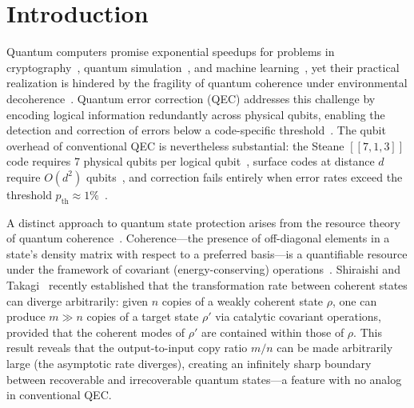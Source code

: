 \documentclass[pra,twocolumn,superscriptaddress,longbibliography,floatfix]{revtex4-2}
\begin{document}
\maketitle


\section{Introduction}
\label{sec:introduction}

Quantum computers promise exponential speedups for problems in cryptography~\cite{Regev2024,Shor1997}, quantum simulation~\cite{Campbell2019,Feynman1982}, and machine learning~\cite{Ivashkov2024,Biamonte2017}, yet their practical realization is hindered by the fragility of quantum coherence under environmental decoherence~\cite{Zurek2003,NielsenChuang2010}.
Quantum error correction (QEC) addresses this challenge by encoding logical information redundantly across physical qubits, enabling the detection and correction of errors below a code-specific threshold~\cite{Shor1995,Gottesman1997}.
The qubit overhead of conventional QEC is nevertheless substantial: the Steane $[\![7,1,3]\!]$ code requires 7 physical qubits per logical qubit~\cite{Steane1996}, surface codes at distance $d$ require $O(d^2)$ qubits~\cite{Kitaev2003,Fowler2012}, and correction fails entirely when error rates exceed the threshold $p_\mathrm{th} \approx 1\%$~\cite{Knill2005}.

A distinct approach to quantum state protection arises from the resource theory of quantum coherence~\cite{Baumgratz2014,Streltsov2017}.
Coherence---the presence of off-diagonal elements in a state's density matrix with respect to a preferred basis---is a quantifiable resource under the framework of covariant (energy-conserving) operations~\cite{Marvian2014,Lostaglio2019}.
Shiraishi and Takagi~\cite{Shiraishi2024} recently established that the transformation rate between coherent states can diverge arbitrarily: given $n$ copies of a weakly coherent state $\rho$, one can produce $m \gg n$ copies of a target state $\rho'$ via catalytic covariant operations, provided that the coherent modes of $\rho'$ are contained within those of $\rho$.
This result reveals that the output-to-input copy ratio $m/n$ can be made arbitrarily large (the asymptotic rate diverges), creating an infinitely sharp boundary between recoverable and irrecoverable quantum states---a feature with no analog in conventional QEC.
\end{document}
